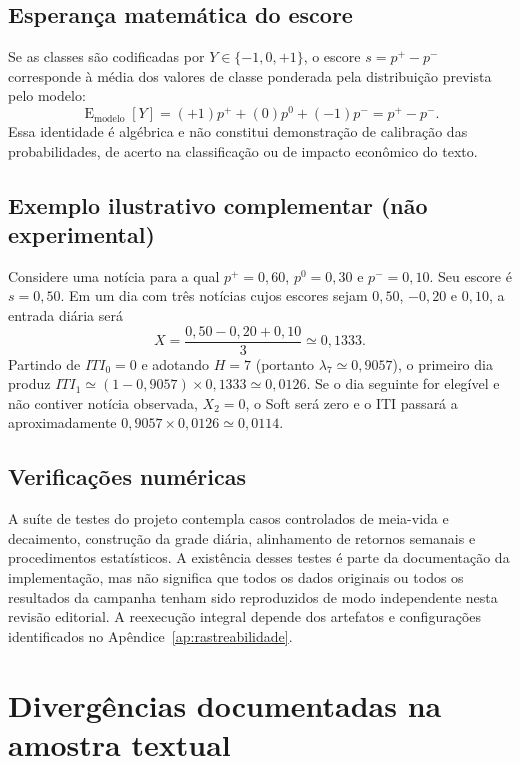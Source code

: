 \section{Esperança matemática do escore}

Se as classes são codificadas por $Y\in\{-1,0,+1\}$, o escore $s=p^+-p^-$ corresponde à média dos valores de classe ponderada pela distribuição prevista pelo modelo:
\begin{equation}
    \operatorname{E}_{\mathrm{modelo}}[Y] = (+1)p^++(0)p^0+(-1)p^-=p^+-p^-.
\end{equation}
Essa identidade é algébrica e não constitui demonstração de calibração das probabilidades, de acerto na classificação ou de impacto econômico do texto.

\section{Exemplo ilustrativo complementar (não experimental)}

Considere uma notícia para a qual $p^+=0{,}60$, $p^0=0{,}30$ e $p^-=0{,}10$. Seu escore é $s=0{,}50$. Em um dia com três notícias cujos escores sejam $0{,}50$, $-0{,}20$ e $0{,}10$, a entrada diária será
\begin{equation}
    X=\frac{0{,}50-0{,}20+0{,}10}{3}\simeq0{,}1333.
\end{equation}
Partindo de $ITI_0=0$ e adotando $H=7$ (portanto $\lambda_7\simeq0{,}9057$), o primeiro dia produz $ITI_1\simeq(1-0{,}9057)\times0{,}1333\simeq0{,}0126$. Se o dia seguinte for elegível e não contiver notícia observada, $X_2=0$, o Soft será zero e o ITI passará a aproximadamente $0{,}9057\times0{,}0126\simeq0{,}0114$.

\section{Verificações numéricas}

A suíte de testes do projeto contempla casos controlados de meia-vida e decaimento, construção da grade diária, alinhamento de retornos semanais e procedimentos estatísticos. A existência desses testes é parte da documentação da implementação, mas não significa que todos os dados originais ou todos os resultados da campanha tenham sido reproduzidos de modo independente nesta revisão editorial. A reexecução integral depende dos artefatos e configurações identificados no Apêndice~\ref{ap:rastreabilidade}.


\chapter{Divergências documentadas na amostra textual}
\label{ap:divergencias}

